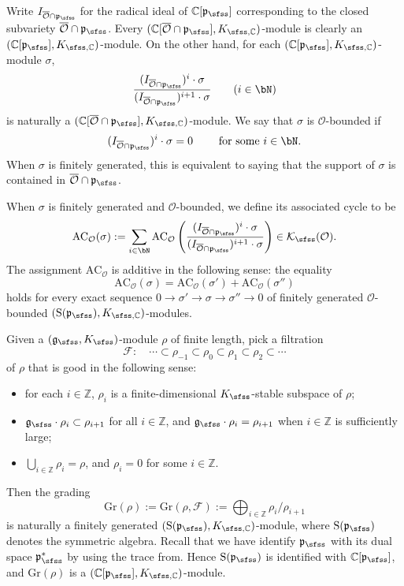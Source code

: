 \documentclass[12pt,a4paper]{amsart}
\newcommand{\CF}{{\mathcal {F}}}
\newcommand{\CK}{{\mathcal {K}}}
\newcommand{\CO}{{\mathcal {O}}}
\newcommand{\oS}{\operatorname{S}}
\newcommand{\g}{\mathfrak g}
\newcommand{\p}{\mathfrak p}
\newcommand{\Z}{\mathbb{Z}}
\newcommand{\be}{\begin {equation}}
\newcommand{\ee}{\end {equation}}
\numberwithin{equation}{section}
\theoremstyle{remark}
\begin{document}
Write $I_{\overline \CO\cap \p_\sfss}$ for the radical ideal of $\C[\p_\sfss]$ corresponding to the closed subvariety $\overline \CO\cap \p_\sfss$.
Every $(\C[\overline \CO\cap \p_\sfss], K_{\sfss, \C})$-module is clearly an $(\C[\p_\sfss], K_{\sfss,\C})$-module.
On the other hand, for each  $(\C[\p_{\sfss}], K_{\sfss, \C})$-module $\sigma$,
\[
  \frac{(I_{\overline \CO\cap \p_\sfss})^i\cdot \sigma}{(I_{\overline \CO\cap \p_\sfss})^{i+1}\cdot \sigma}\qquad (i\in \bN)
\]
is naturally a $(\C[\overline \CO\cap \p_\sfss], K_{\sfss, \C})$-module.
We say that $\sigma$ is $\CO$-bounded if
\[
(I_{\overline \CO\cap \p_\sfss})^i \cdot\sigma=0\qquad
\textrm{
for some $i\in \bN$.}
\]
When $\sigma$ is finitely generated, this is equivalent to saying that  the support of $\sigma$ is contained in $\overline{\CO}\cap \p_\sfss$.

 When $\sigma$ is finitely generated and $\CO$-bounded, we define its associated cycle to be
\[
  \mathrm{AC}_\CO(\sigma):=\sum_{i\in \bN}\mathrm{AC}_\CO\left(\frac{(I_{\overline \CO\cap \p_\sfss})^i\cdot \sigma}{(I_{\overline \CO\cap \p_\sfss})^{i+1}\cdot \sigma}\right)\in  \CK_\sfss(\CO).
\]
The assignment $\mathrm{AC}_\CO$ is additive in the following sense: the equality
\[
 \mathrm{AC}_\CO(\sigma)= \mathrm{AC}_\CO(\sigma')+ \mathrm{AC}_\CO(\sigma'')
\]
holds for every exact sequence
$0\rightarrow \sigma'\rightarrow \sigma\rightarrow \sigma''\rightarrow 0$ of finitely generated $\CO$-bounded $(\oS(\p_{\sfss}), K_{\sfss, \C})$-modules.


Given a $(\g_\sfss, K_{\sfss})$-module $\rho$ of finite length, pick a filtration
\be\label{goodf}
\CF:\quad  \cdots\subset \rho_{-1}\subset \rho_0\subset \rho_1\subset \rho_2\subset \cdots
\ee
of $\rho$ that is good in the following sense:
\begin{itemize}
\item for each $i\in \Z$, $\rho_i$ is a finite-dimensional  $K_{\sfss}$-stable subspace of $\rho$;
\item $\g_\sfss \cdot \rho_i\subset \rho_{i+1}$ for all $i\in \Z$, and $\g_\sfss \cdot \rho_i=\rho_{i+1}$ when  $i\in \Z$ is sufficiently large;
\item $\bigcup_{i\in \Z} \rho_i=\rho$, and $\rho_i=0$ for some $i\in \Z$.
\end{itemize}
Then the grading
\[
  \mathrm{Gr}(\rho):= \mathrm{Gr}(\rho,\CF):=\bigoplus_{i\in \Z} \rho_i/\rho_{i+1}
\]
is naturally a finitely generated  $(\oS(\p_{\sfss}), K_{\sfss, \C})$-module, where $\oS(\p_{\sfss})$ denotes the symmetric algebra. Recall that we have identify $\p_\sfss$ with its dual space $\p_\sfss^*$ by using the trace from. Hence $\oS(\p_{\sfss})$ is identified with $\C[\p_\sfss]$, and $\mathrm{Gr}(\rho)$ is a $(\C[\p_{\sfss}], K_{\sfss, \C})$-module.
\end{document}
